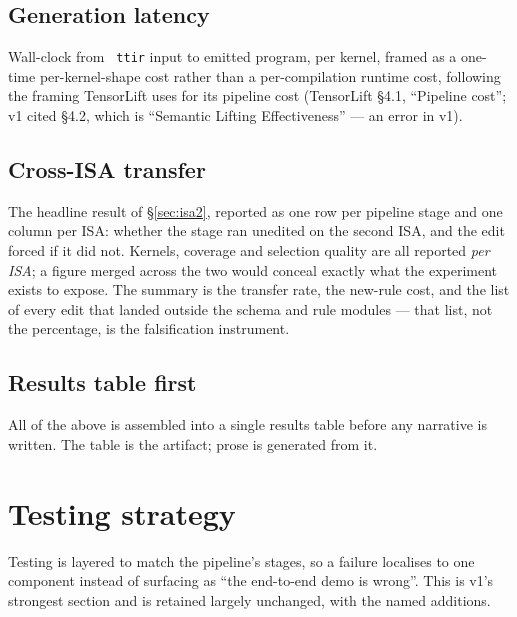 \documentclass[11pt,a4paper]{article}
\newcommand{\code}[1]{\texttt{\small\hyphenchar\font=45 #1}}
\begin{document}
\subsection{Generation latency}

Wall-clock from \code{ttir} input to emitted program, per kernel, framed as a one-time per-kernel-shape cost
rather than a per-compilation runtime cost, following the framing TensorLift uses for its pipeline cost
(TensorLift \S4.1, ``Pipeline cost''; v1 cited \S4.2, which is ``Semantic Lifting Effectiveness'' --- an
error in v1).

\subsection{Cross-ISA transfer}

The headline result of \S\ref{sec:isa2}, reported as one row per pipeline stage and one column per ISA:
whether the stage ran unedited on the second ISA, and the edit forced if it did not. Kernels, coverage and
selection quality are all reported \emph{per ISA}; a figure merged across the two would conceal exactly what
the experiment exists to expose. The summary is the transfer rate, the new-rule cost, and the list of every
edit that landed outside the schema and rule modules --- that list, not the percentage, is the falsification
instrument.

\subsection{Results table first}

All of the above is assembled into a single results table before any narrative is written. The table is the
artifact; prose is generated from it.

\section{Testing strategy}\label{sec:testing}

Testing is layered to match the pipeline's stages, so a failure localises to one component instead of
surfacing as ``the end-to-end demo is wrong''. This is v1's strongest section and is retained largely
unchanged, with the named additions.
\end{document}
